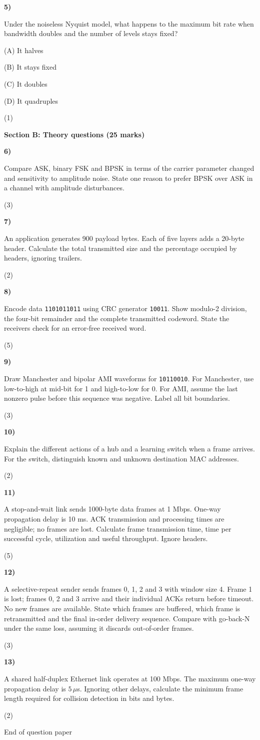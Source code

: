 \documentclass[11pt,a4paper]{article}
\newcommand{\question}[3]{\par\vspace{8pt}\noindent\begin{minipage}[t]{0.075\linewidth}\textbf{#1)}\end{minipage}\begin{minipage}[t]{0.855\linewidth}#3\end{minipage}\hfill\begin{minipage}[t]{0.055\linewidth}\raggedleft(#2)\end{minipage}\par}
\begin{document}
\question{5}{1}{Under the noiseless Nyquist model, what happens to the maximum bit rate when bandwidth doubles and the number of levels stays fixed?\par (A) It halves\par (B) It stays fixed\par (C) It doubles\par (D) It quadruples}
\newpage\textbf{Section B: Theory questions (25 marks)}\par
\question{6}{3}{Compare ASK, binary FSK and BPSK in terms of the carrier parameter changed and sensitivity to amplitude noise. State one reason to prefer BPSK over ASK in a channel with amplitude disturbances.}
\question{7}{2}{An application generates 900 payload bytes. Each of five layers adds a 20-byte header. Calculate the total transmitted size and the percentage occupied by headers, ignoring trailers.}
\question{8}{5}{Encode data \texttt{1101011011} using CRC generator \texttt{10011}. Show modulo-2 division, the four-bit remainder and the complete transmitted codeword. State the receiver\textquotesingle s check for an error-free received word.}
\question{9}{3}{Draw Manchester and bipolar AMI waveforms for \texttt{10110010}. For Manchester, use low-to-high at mid-bit for 1 and high-to-low for 0. For AMI, assume the last nonzero pulse before this sequence was negative. Label all bit boundaries.}
\question{10}{2}{Explain the different actions of a hub and a learning switch when a frame arrives. For the switch, distinguish known and unknown destination MAC addresses.}
\question{11}{5}{A stop-and-wait link sends 1000-byte data frames at 1 Mbps. One-way propagation delay is 10 ms. ACK transmission and processing times are negligible; no frames are lost. Calculate frame transmission time, time per successful cycle, utilization and useful throughput. Ignore headers.}
\question{12}{3}{A selective-repeat sender sends frames 0, 1, 2 and 3 with window size 4. Frame 1 is lost; frames 0, 2 and 3 arrive and their individual ACKs return before timeout. No new frames are available. State which frames are buffered, which frame is retransmitted and the final in-order delivery sequence. Compare with go-back-N under the same loss, assuming it discards out-of-order frames.}
\question{13}{2}{A shared half-duplex Ethernet link operates at 100 Mbps. The maximum one-way propagation delay is $5\,\mu$s. Ignoring other delays, calculate the minimum frame length required for collision detection in bits and bytes.}
\vfill\begin{center}\small End of question paper\end{center}
\end{document}
